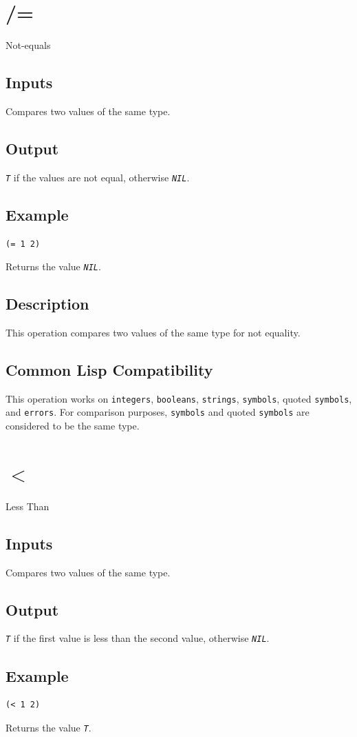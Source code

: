 \documentclass[10pt, openany]{book}
\newcommand{\constant}[1]{\emph{\texttt{#1}}}
\newcommand{\datatype}[1]{\texttt{#1}}
\begin{document}
\section{/=}
Not-equals
\subsection{Inputs}
Compares two values of the same type.
\subsection{Output}
\constant{T} if the values are not equal, otherwise \constant{NIL}.
\subsection{Example}
\begin{lstlisting}
(= 1 2)
\end{lstlisting}
Returns the value \constant{NIL}.
\subsection{Description}
This operation compares two values of the same type for not equality.
\subsection{Common Lisp Compatibility}
This operation works on \datatype{integers}, \datatype{booleans}, \datatype{strings}, \datatype{symbols}, quoted \datatype{symbols}, and \datatype{errors}.  For comparison purposes, \datatype{symbols} and quoted \datatype{symbols} are considered to be the same type.

\section{$<$}
Less Than
\subsection{Inputs}
Compares two values of the same type.
\subsection{Output}
\constant{T} if the first value is less than the second value, otherwise \constant{NIL}.
\subsection{Example}
\begin{lstlisting}
(< 1 2)
\end{lstlisting}
Returns the value \constant{T}.
\end{document}
